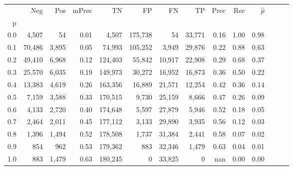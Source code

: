 \begin{tabular}{rrrrrrrrrrrrrr}
\toprule
{} &     Neg &    Pos & mPrec &       TN &       FP &      FN &      TP &  Prec &   Rec & $\hat{p}$ \\
p   &         &        &       &          &          &         &         &       &       &           \\
\midrule
0.0 &   4,507 &     54 &  0.01 &    4,507 &  175,738 &      54 &  33,771 &  0.16 &  1.00 &      0.98 \\
0.1 &  70,486 &  3,895 &  0.05 &   74,993 &  105,252 &   3,949 &  29,876 &  0.22 &  0.88 &      0.63 \\
0.2 &  49,410 &  6,968 &  0.12 &  124,403 &   55,842 &  10,917 &  22,908 &  0.29 &  0.68 &      0.37 \\
0.3 &  25,570 &  6,035 &  0.19 &  149,973 &   30,272 &  16,952 &  16,873 &  0.36 &  0.50 &      0.22 \\
0.4 &  13,383 &  4,619 &  0.26 &  163,356 &   16,889 &  21,571 &  12,254 &  0.42 &  0.36 &      0.14 \\
0.5 &   7,159 &  3,588 &  0.33 &  170,515 &    9,730 &  25,159 &   8,666 &  0.47 &  0.26 &      0.09 \\
0.6 &   4,133 &  2,720 &  0.40 &  174,648 &    5,597 &  27,879 &   5,946 &  0.52 &  0.18 &      0.05 \\
0.7 &   2,464 &  2,011 &  0.45 &  177,112 &    3,133 &  29,890 &   3,935 &  0.56 &  0.12 &      0.03 \\
0.8 &   1,396 &  1,494 &  0.52 &  178,508 &    1,737 &  31,384 &   2,441 &  0.58 &  0.07 &      0.02 \\
0.9 &     854 &    962 &  0.53 &  179,362 &      883 &  32,346 &   1,479 &  0.63 &  0.04 &      0.01 \\
1.0 &     883 &  1,479 &  0.63 &  180,245 &        0 &  33,825 &       0 &   nan &  0.00 &      0.00 \\
\bottomrule
\end{tabular}
